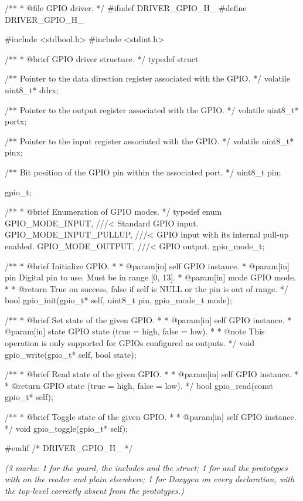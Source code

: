 \begin{ccode}
/**
 * @file GPIO driver.
 */
#ifndef DRIVER_GPIO_H_
#define DRIVER_GPIO_H_

#include <stdbool.h>
#include <stdint.h>

/**
 * @brief GPIO driver structure.
 */
typedef struct
{
    /** Pointer to the data direction register associated with the GPIO. */
    volatile uint8_t* ddrx;

    /** Pointer to the output register associated with the GPIO. */
    volatile uint8_t* portx;

    /** Pointer to the input register associated with the GPIO. */
    volatile uint8_t* pinx;

    /** Bit position of the GPIO pin within the associated port. */
    uint8_t pin;
} gpio_t;

/**
 * @brief Enumeration of GPIO modes.
 */
typedef enum
{
    GPIO_MODE_INPUT,        ///< Standard GPIO input.
    GPIO_MODE_INPUT_PULLUP, ///< GPIO input with its internal pull-up enabled.
    GPIO_MODE_OUTPUT,       ///< GPIO output.
} gpio_mode_t;

/**
 * @brief Initialize GPIO.
 *
 * @param[in] self GPIO instance.
 * @param[in] pin  Digital pin to use. Must be in range [0, 13].
 * @param[in] mode GPIO mode.
 *
 * @return True on success, false if self is NULL or the pin is out of range.
 */
bool gpio_init(gpio_t* self, uint8_t pin, gpio_mode_t mode);

/**
 * @brief Set state of the given GPIO.
 *
 * @param[in] self  GPIO instance.
 * @param[in] state GPIO state (true = high, false = low).
 *
 * @note This operation is only supported for GPIOs configured as outputs.
 */
void gpio_write(gpio_t* self, bool state);

/**
 * @brief Read state of the given GPIO.
 *
 * @param[in] self GPIO instance.
 *
 * @return GPIO state (true = high, false = low).
 */
bool gpio_read(const gpio_t* self);

/**
 * @brief Toggle state of the given GPIO.
 *
 * @param[in] self GPIO instance.
 */
void gpio_toggle(gpio_t* self);

#endif /* DRIVER_GPIO_H_ */
\end{ccode}

{\itshape (3 marks: 1 for the guard, the includes and the struct; 1 for  and the
prototypes with  on the reader and plain  elsewhere; 1 for
Doxygen on every declaration, with the top-level  correctly absent from the
prototypes.)\par}

